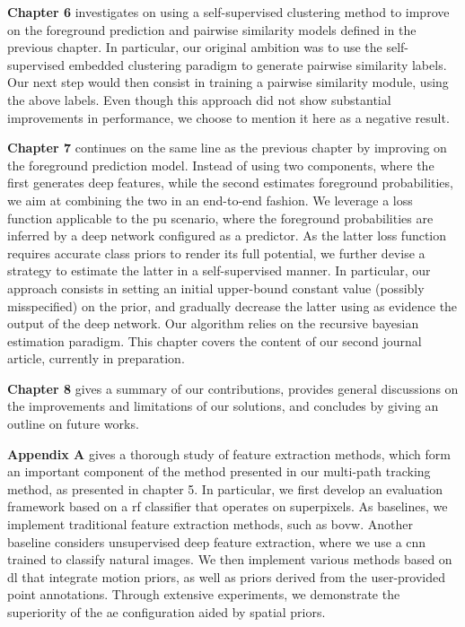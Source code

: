 \textbf{Chapter 6} investigates on using a self-supervised clustering method to improve on the foreground prediction and pairwise similarity models defined in the previous chapter.
In particular, our original ambition was to use the self-supervised embedded clustering paradigm to generate pairwise similarity labels.
Our next step would then consist in training a pairwise similarity module, using the above labels.
Even though this approach did not show substantial improvements in performance, we choose to mention it here as a negative result.

\textbf{Chapter 7} continues on the same line as the previous chapter by improving on the foreground prediction model.
Instead of using two components, where the first generates deep features, while the second estimates foreground probabilities, we aim at combining the two in an end-to-end fashion.
We leverage a loss function applicable to the \gls{pu} scenario, where the foreground probabilities are inferred by a deep network configured as a predictor.
As the latter loss function requires accurate class priors to render its full potential, we further devise a strategy to estimate the latter in a self-supervised manner.
In particular, our approach consists in setting an initial upper-bound constant value (possibly misspecified) on the prior, and gradually decrease the latter using as evidence the output of the deep network.
Our algorithm relies on the recursive bayesian estimation paradigm.
This chapter covers the content of our second journal article, currently in preparation.

\textbf{Chapter 8} gives a summary of our contributions, provides general discussions on the improvements and limitations of our solutions, and concludes by giving an outline on future works.

\textbf{Appendix A} gives a thorough study of feature extraction methods, which form an important component of the method presented in our multi-path tracking method, as presented in chapter 5.
In particular, we first develop an evaluation framework based on a \gls{rf} classifier that operates on superpixels.
As baselines, we implement traditional feature extraction methods, such as \gls{bovw}.
Another baseline considers unsupervised deep feature extraction, where we use a \gls{cnn} trained to classify natural images.
We then implement various methods based on \gls{dl} that integrate motion priors, as well as priors derived from the user-provided point annotations.
Through extensive experiments, we demonstrate the superiority of the \gls{ae} configuration aided by spatial priors.

